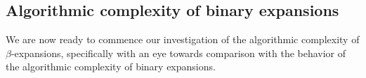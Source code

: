 \subsection{\texorpdfstring{Algorithmic complexity of binary expansions}{}}

We are now ready to commence our investigation of the algorithmic complexity of $\beta$-expansions, specifically with an eye towards comparison with the behavior of the algorithmic complexity of binary expansions. 


